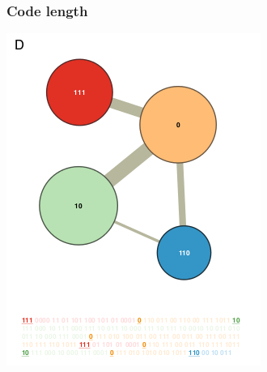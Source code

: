 \documentclass{beamer}
\begin{document}
\begin{frame}
  \frametitle{Code length}
  \begin{center}
    \includegraphics[height=0.8\textheight,width=\textwidth,keepaspectratio=true]{figure/map4}

    \tiny{}

  \end{center}
\end{frame}
\end{document}
